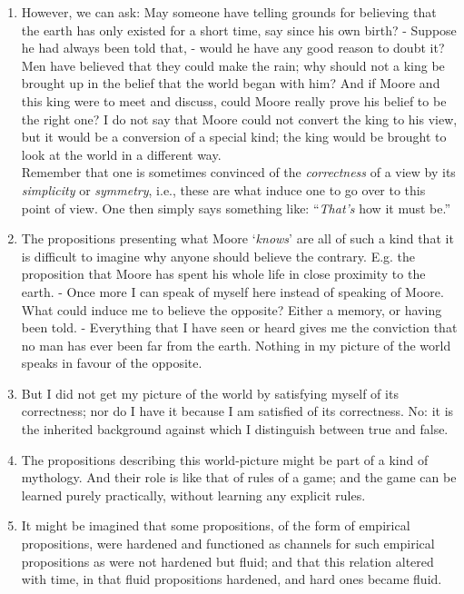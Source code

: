 \documentclass{book}
\begin{document}
\begin{enumerate}
\item
However, we can ask: May someone have telling grounds for believing that the
earth has only existed for a short time, say since his own birth? - Suppose he
had always been told that, - would he have any good reason to doubt it? Men
have believed that they could make the rain; why should not a king be brought
up in the belief that the world began with him? And if Moore and this king were
to meet and discuss, could Moore really prove his belief to be the right one? I
do not say that Moore could not convert the king to his view, but it would be a
conversion of a special kind; the king would be brought to look at the world in
a different way. \\
Remember that one is sometimes convinced of the \emph{correctness} of a view by
its \emph{simplicity} or \emph{symmetry}, i.e., these are what induce one to go
over to this point of view. One then simply says something like:
``\emph{That's} how it must be.''

\item
The propositions presenting what Moore `\emph{knows}' are all of such a kind
that it is difficult to imagine why anyone should believe the contrary. E.g.
the proposition that Moore has spent his whole life in close proximity to the
earth. - Once more I can speak of myself here instead of speaking of Moore.
What could induce me to believe the opposite? Either a memory, or having been
told. - Everything that I have seen or heard gives me the conviction that no
man has ever been far from the earth. Nothing in my picture of the world speaks
in favour of the opposite.

\item
But I did not get my picture of the world by satisfying myself of its
correctness; nor do I have it because I am satisfied of its correctness. No: it
is the inherited background against which I distinguish between true and false.

\item
The propositions describing this world-picture might be part of a kind of
mythology. And their role is like that of rules of a game; and the game can be
learned purely practically, without learning any explicit rules.

\item
It might be imagined that some propositions, of the form of empirical
propositions, were hardened and functioned as channels for such empirical
propositions as were not hardened but fluid; and that this relation altered
with time, in that fluid propositions hardened, and hard ones became fluid.


\end{enumerate}
\end{document}
